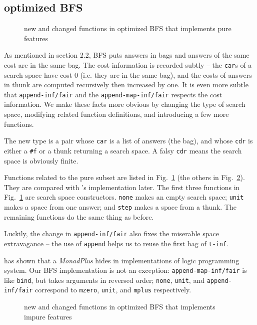 \documentclass[format=acmlarge, review=true, authordraft=true]{acmart}
\begin{document}
\subsection{optimized BFS}

\begin{figure}
		
	\caption{new and changed functions in optimized BFS that implements pure 
	features}
	\label{BFS-opt}
\end{figure}

As mentioned in section 2.2, BFS puts answers in bags and answers of the 
same cost are in the same bag. The cost
information is recorded subtly -- the \texttt{car}s of a search space have cost 
0 (i.e. they are in the same bag), and the costs of answers in thunk are 
computed recursively then increased by one. It is even more subtle that
\texttt{append-inf/fair} and the \texttt{append-map-inf/fair} respects the cost 
information. We make these facts more obvious by changing the type of search 
space, modifying related function definitions, and introducing a few more 
functions.

The new type is a pair whose \texttt{car} is a list of answers (the bag), and 
whose \texttt{cdr} is either a \texttt{\#{}f} or a thunk returning a search 
space. A falsy \texttt{cdr} means the search space is obviously finite. 

Functions related to the pure subset are listed in Fig.~\ref{BFS-opt} (the 
others in Fig.~\ref{BFS-opt-cont}). They are compared with 
\citeauthor{seres1999algebra}'s implementation later. The first three functions 
in Fig.~\ref{BFS-opt} are search space constructors. \texttt{none} makes an 
empty search space; \texttt{unit} makes a space from one answer; and 
\texttt{step} makes a space from a thunk. The remaining functions do the same 
thing as before. 

Luckily, the change in \texttt{append-inf/fair} also fixes the miserable space 
extravagance -- the use of \texttt{append} helps us to reuse the first bag of 
\texttt{t-inf}.

\citet{kiselyov2005backtracking} has shown that a \emph{MonadPlus} hides in 
implementations of logic programming system. Our BFS implementation is not an 
exception: \texttt{append-map-inf/fair} is like \texttt{bind}, 
but takes arguments in reversed order; \texttt{none}, \texttt{unit}, and 
\texttt{append-inf/fair} correspond to \texttt{mzero}, \texttt{unit}, 
and \texttt{mplus} respectively.

\begin{figure}
		
	\caption{new and changed functions in optimized BFS that implements impure 
		features}
	\label{BFS-opt-cont}
\end{figure}
\end{document}
